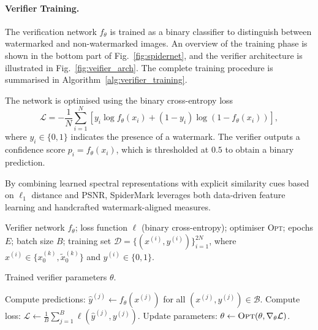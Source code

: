 \paragraph{Verifier Training.}
The verification network $f_{\theta}$ is trained as a binary classifier to distinguish between watermarked and non-watermarked images.
An overview of the training phase is shown in the bottom part of Fig.~\ref{fig:spidernet}, and the verifier architecture is illustrated in Fig.~\ref{fig:veifier_arch}.
The complete training procedure is summarised in Algorithm~\ref{alg:verifier_training}.

The network is optimised using the binary cross-entropy loss
\begin{equation}
    \mathcal{L} = - \frac{1}{N} \sum_{i=1}^{N}
    \left[y_i \log f_{\theta}(x_i) + (1 - y_i)\log(1 - f_{\theta}(x_i))\right],
\end{equation}
where $y_i \in \{0,1\}$ indicates the presence of a watermark.
The verifier outputs a confidence score $p_i = f_{\theta}(x_i)$, which is thresholded at $0.5$ to obtain a binary prediction.

By combining learned spectral representations with explicit similarity cues based on $\ell_1$ distance and PSNR, SpiderMark leverages both data-driven feature learning and handcrafted watermark-aligned measures.


\begin{algorithm}[t]
\caption{{\color{blue}Verifier Training}}
\label{alg:verifier_training}
\begin{algorithmic}[1]
\Require
Verifier network $f_\theta$;
loss function $\ell$ (binary cross-entropy);
optimiser \textsc{Opt};
epochs $E$;
batch size $B$;
training set $\mathcal{D} = \{(x^{(i)}, y^{(i)})\}_{i=1}^{2N}$,
where $x^{(i)} \in \{x_0^{(k)}, \tilde{x}_0^{(k)}\}$ and $y^{(i)} \in \{0,1\}$.

\Ensure
Trained verifier parameters $\theta$.

        \State Compute predictions: $\hat{y}^{(j)} \leftarrow f_\theta(x^{(j)})$ for all $(x^{(j)},y^{(j)}) \in \mathcal{B}$.
        \State Compute loss: $\mathcal{L} \leftarrow \frac{1}{B}\sum_{j=1}^{B}\ell(\hat{y}^{(j)}, y^{(j)})$.
        \State Update parameters: $\theta \leftarrow \textsc{Opt}(\theta, \nabla_\theta \mathcal{L})$.
    \EndFor
\EndFor
\end{algorithmic}
\end{algorithm}

